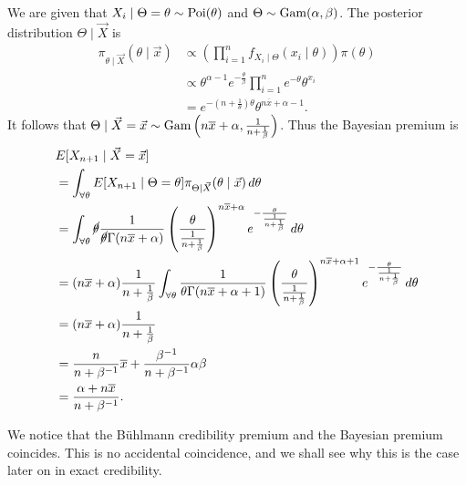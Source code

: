 \documentclass[notoc,notitlepage]{tufte-book}
\begin{document}
\begin{solution}
  \noindent
   We are given that $X_i \mid \Theta = \theta \sim
  \operatorname{Poi}(\theta)$ and $\Theta \sim \operatorname{Gam}(\alpha, \beta)$. The posterior
  distribution $\Theta \mid \vec{X}$ is
  \begin{align*}
    \pi_{\theta \mid \vec{X}}(\theta \mid \vec{x})
    &\propto \left( \prod_{i=1}^{n} f_{X_i \mid \Theta}(x_i \mid \theta) \right)
      \pi(\theta) \\
    &\propto \theta^{\alpha - 1} e^{-\frac{\theta}{\beta}} \prod_{i=1}^{n}
      e^{-\theta} \theta^{x_i} \\
    &= e^{-(n + \frac{1}{\theta}) \theta} \theta^{n \overline{x} + \alpha - 1}.
  \end{align*}
  It follows that $\Theta \mid \vec{X} = \vec{x} \sim \operatorname{Gam}\left(n \overline{x} +
  \alpha, \frac{1}{n + \frac{1}{\beta}}\right)$. Thus the Bayesian premium is
  \begin{align*}
    &E[X_{n+1} \mid \vec{X} = \vec{x}] \\
    &= \int_{\forall \theta} E[X_{n+1} \mid \Theta = \theta] \pi_{\Theta \mid
      \vec{X}}(\theta \mid \vec{x}) \mathop{}\!d{\theta} \\
    &= \int_{\forall \theta} \cancel{\theta} \frac{1}{\cancel{\theta} \Gamma(n
      \overline{x} + \alpha)} \left( \frac{\theta}{\frac{1}{n + \frac{1}{\beta}}}
      \right)^{n \overline{x} + \alpha} e^{- \frac{\theta}{\frac{1}{n +
      \frac{1}{\beta}}}} \mathop{}\!d{\theta} \\
    &= (n \overline{x} + \alpha) \frac{1}{n + \frac{1}{\beta}}
      \int_{\forall \theta} \frac{1}{\theta \Gamma(n \overline{x} + \alpha + 1)}
      \left( \frac{\theta}{\frac{1}{n + \frac{1}{\beta}}} \right)^{n
      \overline{x} + \alpha + 1} e^{-\frac{\theta}{\frac{1}{n +
      \frac{1}{\beta}}}} \mathop{}\!d{\theta} \\
    &= (n \overline{x} + \alpha) \frac{1}{n + \frac{1}{\beta}} \\
    &= \frac{n}{n + \beta^{-1}} \overline{x} + \frac{\beta^{-1}}{n + \beta^{-1}}
      \alpha\beta \\
    &= \frac{\alpha + n \overline{x}}{n + \beta^{-1}}.
  \end{align*}
\end{solution}

\begin{note}
  We notice that the B\"{u}hlmann credibility premium and the Bayesian premium
  coincides. This is no accidental coincidence, and we shall see why this is the
  case later on in exact credibility.
\end{note}
\end{document}
